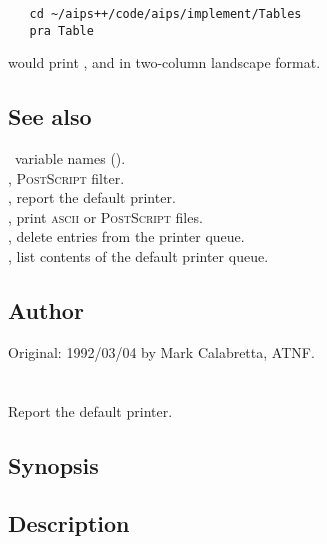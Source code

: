 \begin{verbatim}
   cd ~/aips++/code/aips/implement/Tables
   pra Table
\end{verbatim}

\noindent
would print , and  in two-column landscape
format.

\subsection*{See also}

\aipspp\ variable names ().\\
, \textsc{PostScript} filter.\\
, report the default printer.\\
, print \textsc{ascii} or \textsc{PostScript} files.\\
, delete entries from the printer queue.\\
, list contents of the default printer queue.

\subsection*{Author}

Original: 1992/03/04 by Mark Calabretta, ATNF.


\newpage
\section{}
\label{prd}



Report the default printer.

\subsection*{Synopsis}

\begin{synopsis}
\end{synopsis}

\subsection*{Description}

